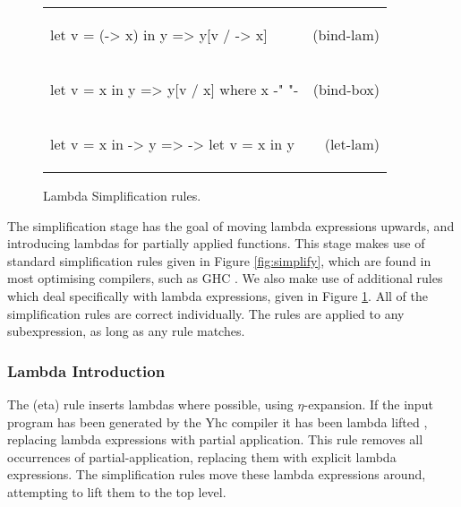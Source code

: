 \documentclass[preprint]{sigplanconf}
\newcommand{\simp}[2]{\vspace{-7mm} #2 & (#1) \\}
\newenvironment{simplify}
    {\noindent
     \begin{flushright}
     \begin{tabular}{p{6.5cm}r}
    }
    {\end{tabular}
     \vspace{-7mm}
     \end{flushright}
    }
\begin{document}
\begin{figure}
\begin{simplify}

\simp{bind-lam}{
\ignore\begin{code}
let v = (\w -> x) in y
    => y[v / \w -> x]
\end{code}}

\simp{bind-box}{
\ignore\begin{code}
let v = x in y
    => y[v / x]
    where x {-" \text{ is a boxed lambda (see \S\ref{sec:inlining})} "-}
\end{code}}

\simp{let-lam}{
\ignore\begin{code}
let v = x in \w -> y
    => \w -> let v = x in y
\end{code}}

\end{simplify}
\caption{Lambda Simplification rules.}
\label{fig:lambda_simplify}
\end{figure}

The simplification stage has the goal of moving lambda expressions upwards, and introducing lambdas for partially applied functions. This stage makes use of standard simplification rules given in Figure \ref{fig:simplify}, which are found in most optimising compilers, such as GHC \cite{spj:transformation}. We also make use of additional rules which deal specifically with lambda expressions, given in Figure \ref{fig:lambda_simplify}. All of the simplification rules are correct individually. The rules are applied to any subexpression, as long as any rule matches.

\subsubsection{Lambda Introduction}

The (eta) rule inserts lambdas where possible, using $\eta$-expansion. If the input program has been generated by the Yhc compiler it has been lambda lifted \cite{lambda_lift}, replacing lambda expressions with partial application. This rule removes all occurrences of partial-application, replacing them with explicit lambda expressions. The simplification rules move these lambda expressions around, attempting to lift them to the top level.
\end{document}

